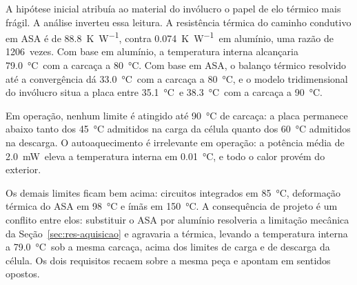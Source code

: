 A hipótese inicial atribuía ao material do invólucro o papel de elo térmico mais frágil. A
análise inverteu essa leitura. A resistência térmica do caminho condutivo em ASA é de
\SI{88,8}{\kelvin\per\watt}\pE, contra \SI{0,074}{\kelvin\per\watt}\pE\ em alumínio, uma
razão de \num{1206}\pE\ vezes. Com base em alumínio, a temperatura interna alcançaria
\SI{79,0}{\celsius}\pE\ com a carcaça a \SI{80}{\celsius}. Com base em ASA, o balanço
térmico resolvido até a convergência dá \SI{33,0}{\celsius}\pE\ com a carcaça a
\SI{80}{\celsius}, e o modelo tridimensional do invólucro situa a placa entre
\SI{35,1}{\celsius}\pE\ e \SI{38,3}{\celsius}\pE\ com a carcaça a \SI{90}{\celsius}.

Em operação, nenhum limite é atingido até \SI{90}{\celsius} de carcaça: a placa permanece
abaixo tanto dos \SI{45}{\celsius} admitidos na carga da célula quanto dos
\SI{60}{\celsius} admitidos na descarga. O autoaquecimento é irrelevante em operação: a
potência média de \SI{2,0}{\milli\watt}\pE\ eleva a temperatura interna em
\SI{0,01}{\celsius}\pE, e todo o calor provém do exterior.


Os demais limites ficam bem acima: circuitos integrados em \SI{85}{\celsius}, deformação
térmica do ASA em \SI{98}{\celsius} e ímãs em \SI{150}{\celsius}. A consequência de projeto
é um conflito entre elos: substituir o ASA por alumínio resolveria a limitação mecânica da
Seção~\ref{sec:res-aquisicao} e agravaria a térmica, levando a temperatura interna a
\SI{79,0}{\celsius}\pE\ sob a mesma carcaça, acima dos limites de carga e de descarga da
célula. Os dois requisitos recaem sobre a mesma peça e apontam em sentidos opostos.

